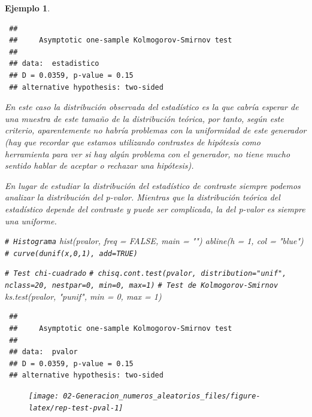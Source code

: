 \documentclass[
  10pt,
]{book}
\newenvironment{Shaded}{\begin{snugshade}}{\end{snugshade}}
\newcommand{\AttributeTok}[1]{\textcolor[rgb]{0.77,0.63,0.00}{#1}}
\newcommand{\CommentTok}[1]{\textcolor[rgb]{0.56,0.35,0.01}{\textit{#1}}}
\newcommand{\ConstantTok}[1]{\textcolor[rgb]{0.00,0.00,0.00}{#1}}
\newcommand{\DecValTok}[1]{\textcolor[rgb]{0.00,0.00,0.81}{#1}}
\newcommand{\FunctionTok}[1]{\textcolor[rgb]{0.00,0.00,0.00}{#1}}
\newcommand{\NormalTok}[1]{#1}
\newcommand{\StringTok}[1]{\textcolor[rgb]{0.31,0.60,0.02}{#1}}
\theoremstyle{break}
\newtheorem{example}{Ejemplo}[chapter]
\theoremstyle{nonumberplain}
\renewcommand{\CommentTok}[1]{\textcolor[rgb]{0.41,0.41,0.41}{\texttt{#1}}}
\begin{document}
\begin{example}
\begin{verbatim}
 ## 
 ##     Asymptotic one-sample Kolmogorov-Smirnov test
 ## 
 ## data:  estadistico
 ## D = 0.0359, p-value = 0.15
 ## alternative hypothesis: two-sided
\end{verbatim}

En este caso la distribución observada del estadístico es la que cabría esperar de una muestra de este tamaño de la distribución teórica, por tanto, según este criterio, aparentemente no habría problemas con la uniformidad de este generador (hay que recordar que estamos utilizando contrastes de hipótesis como herramienta para ver si hay algún problema con el generador, no tiene mucho sentido hablar de aceptar o rechazar una hipótesis).

En lugar de estudiar la distribución del estadístico de contraste siempre podemos analizar la distribución del p-valor.
Mientras que la distribución teórica del estadístico depende del contraste y puede ser complicada, la del p-valor es siempre una uniforme.

\begin{Shaded}
\begin{Highlighting}[]
\CommentTok{\# Histograma}
\FunctionTok{hist}\NormalTok{(pvalor, }\AttributeTok{freq =} \ConstantTok{FALSE}\NormalTok{, }\AttributeTok{main =} \StringTok{""}\NormalTok{)}
\FunctionTok{abline}\NormalTok{(}\AttributeTok{h =} \DecValTok{1}\NormalTok{, }\AttributeTok{col =} \StringTok{"blue"}\NormalTok{) }\CommentTok{\# curve(dunif(x,0,1), add=TRUE)}

\CommentTok{\# Test chi{-}cuadrado}
\CommentTok{\# chisq.cont.test(pvalor, distribution="unif", nclass=20, nestpar=0, min=0, max=1)}
\CommentTok{\# Test de Kolmogorov{-}Smirnov}
\FunctionTok{ks.test}\NormalTok{(pvalor, }\StringTok{"punif"}\NormalTok{,  }\AttributeTok{min =} \DecValTok{0}\NormalTok{, }\AttributeTok{max =} \DecValTok{1}\NormalTok{)}
\end{Highlighting}
\end{Shaded}

\begin{verbatim}
 ## 
 ##     Asymptotic one-sample Kolmogorov-Smirnov test
 ## 
 ## data:  pvalor
 ## D = 0.0359, p-value = 0.15
 ## alternative hypothesis: two-sided
\end{verbatim}

\begin{figure}[!htbp]

{\centering \texttt{[image: 02-Generacion\_numeros\_aleatorios\_files/figure-latex/rep-test-pval-1]} 

}
\end{figure}
\end{example}
\end{document}
